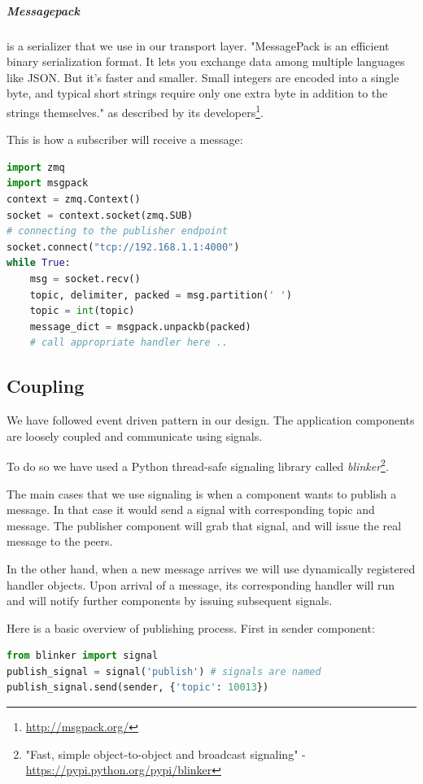 \subparagraph{Messagepack} is a serializer that we use in our transport layer. 
"MessagePack is an efficient binary serialization format. 
It lets you exchange data among multiple languages like JSON.
But it's faster and smaller. 
Small integers are encoded into a single byte, 
and typical short strings require only one extra byte in addition to the strings themselves."
as described by its developers\footnote{\url{http://msgpack.org/}}.

This is how a subscriber will receive a message:
\begin{lstlisting}[language=python, caption={Subscriber receives and unpacks a message}]
import zmq
import msgpack
context = zmq.Context()
socket = context.socket(zmq.SUB)
# connecting to the publisher endpoint
socket.connect("tcp://192.168.1.1:4000")
while True:
    msg = socket.recv()
    topic, delimiter, packed = msg.partition(' ')
    topic = int(topic)
    message_dict = msgpack.unpackb(packed)
    # call appropriate handler here ..
\end{lstlisting}

\subsection{Coupling}
We have followed event driven pattern in our design.
The application components are loosely coupled and communicate using signals.

To do so we have used a Python thread-safe signaling library 
called \textit{blinker}\footnote{"Fast, simple object-to-object and broadcast signaling" -
\url{https://pypi.python.org/pypi/blinker}}.

The main cases that we use signaling is when a component wants to publish a message. 
In that case it would send a signal with corresponding topic and message. 
The publisher component will grab that signal, and will issue the real message to the peers.

In the other hand, when a new message arrives we will use dynamically registered handler objects.
Upon arrival of a message,
 its corresponding handler will run and will notify further components by issuing subsequent signals.

Here is a basic overview of publishing process. First in sender component:

\begin{lstlisting}[language=python, caption={Publishing an internal signal with blinker}]
from blinker import signal
publish_signal = signal('publish') # signals are named
publish_signal.send(sender, {'topic': 10013})
\end{lstlisting}

